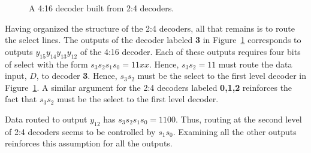 \begin{figure}[ht]
\caption{A 4:16 decoder built from 2:4 decoders.} 
\label{fig:comboBBBigDecoder}
\end{figure}

Having organized the structure of the 2:4 decoders, all that remains 
is to route the select lines.  The outputs of the decoder labeled 
\textbf{ 3} in Figure~\ref{fig:comboBBBigDecoder} corresponds to outputs 
$y_{15} y_{14} y_{13} y_{12}$ 
of the 4:16 decoder.  Each of these outputs requires four bits of 
select with the form $s_3 s_2 s_1 s_0 = 11xx$.  Hence, $s_3 s_2 = 11$ 
must route the data input, $D$, to decoder \textbf{ 3}.  Hence, $s_3 s_2$ 
must be the select to the first level decoder in 
Figure~\ref{fig:comboBBBigDecoder}.   A similar argument for the 2:4 decoders 
labeled \textbf{ 0,1,2} reinforces the fact that $s_3 s_2$ must be the select 
to the first level decoder.  

Data routed to output $y_{12}$ has $s_3 s_2 s_1 s_0 = 1100$.  Thus, routing
at the second level of 2:4 decoders seems to be controlled by $s_1 s_0$.
Examining all the other outputs reinforces this assumption for all
the outputs.


